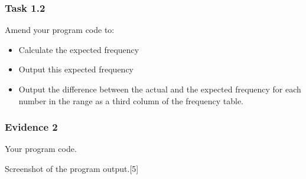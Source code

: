 \subsubsection*{Task 1.2}

Amend your program code to:
\begin{itemize}
\item Calculate the expected frequency
\item Output this expected frequency
\item Output the difference between the actual and the expected frequency
for each number in the range as a third column of the frequency table.
\end{itemize}

\subsubsection*{Evidence 2}

Your program code.

Screenshot of the program output.\hfill{}{[}5{]}